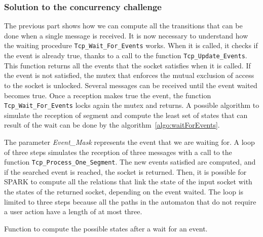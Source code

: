 \documentclass[runningheads]{llncs}
\begin{document}
\subsubsection{Solution to the concurrency challenge}

    The previous part shows how we can compute all the transitions that can be done when a single message is received.
    It is now necessary to understand how the waiting procedure \lstinline{Tcp_Wait_For_Events} works.
    When it is called, it checks if the event is already true, thanks to a call to the function \lstinline{Tcp_Update_Events}.
    This function returns all the events that the socket satisfies when it is called.
    If the event is not satisfied, the mutex that enforces the mutual exclusion of access to the socket is unlocked.
    Several messages can be received until the event waited becomes true.
    Once a reception makes true the event, the function \lstinline{Tcp_Wait_For_Events} locks again the mutex and returns.
    A possible algorithm to simulate the reception of segment and compute the least set of states that can result of the wait can be done
    by the algorithm~\ref{algo:waitForEvents}.

    The parameter \textit{Event\_Mask} represents the event that we are waiting for. A loop of three steps simulates the
    reception of three messages with a call to the function \lstinline[style=Spark]{Tcp_Process_One_Segment}. The new events
    satisfied are computed, and if the searched event is reached, the socket is returned.
    Then, it is possible for SPARK to compute all the relations that link the state of the input socket with the states
    of the returned socket, depending on the event waited.
    The loop is limited to three steps because all the paths in the automaton that do not require a user action have
    a length of at most three.

    \begin{algorithm}
        \caption{Function to compute the possible states after a wait for an event.}
        \label{algo:waitForEvents}
    \end{algorithm}
\end{document}
